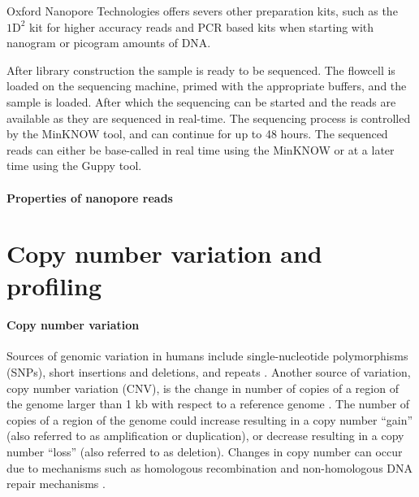Oxford Nanopore Technologies offers severs other preparation kits, such
as the $\text{1D}^2$ kit for higher accuracy reads and PCR based kits when
starting with nanogram or picogram amounts of DNA.

After library construction the sample is ready to be sequenced. The
flowcell is loaded on the sequencing machine, primed with the appropriate
buffers, and the sample is loaded. After which the sequencing can be
started and the reads are available as they are sequenced in real-time.
%
The sequencing process is controlled by the MinKNOW tool, and can
continue for up to 48 hours.
The sequenced reads can either be base-called in real time using the
MinKNOW or at a later time using the Guppy tool.

\paragraph{Properties of nanopore reads}



\section{Copy number variation and profiling}
\paragraph{Copy number variation}
Sources of genomic variation in humans include
single-nucleotide polymorphisms (SNPs), short insertions and deletions, and
repeats \citep{}. 
Another source of variation, copy number variation (CNV), is the change in
number of copies of a region of the genome larger than 1 kb with
respect to a reference genome
\citep{redon2006global,feuk2006structural}.  The number of copies of a
region of the genome could increase resulting in a copy number ``gain''
(also referred to as amplification or duplication), or decrease resulting in a
copy number ``loss'' (also referred to as deletion). 
Changes in copy number can occur due to mechanisms such as homologous
recombination and non-homologous DNA repair mechanisms
\citep{hastings2009mechanisms,van2011origins}.

